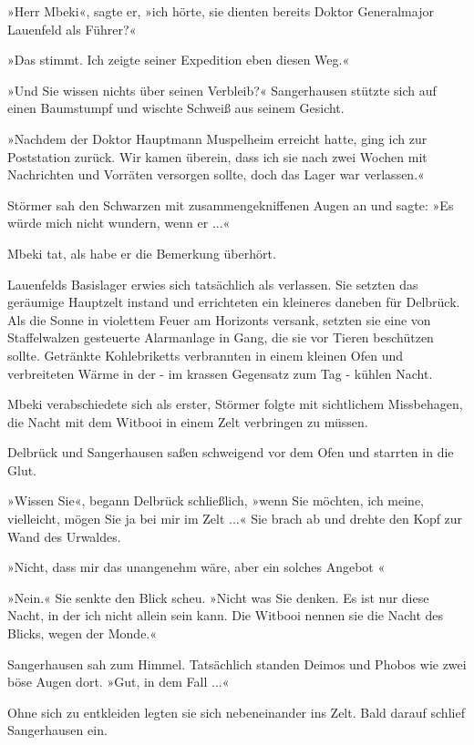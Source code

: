 »Herr Mbeki«, sagte er, »ich hörte, sie dienten bereits Doktor
Generalmajor Lauenfeld als Führer?«

»Das stimmt. Ich zeigte seiner Expedition eben diesen Weg.«

»Und Sie wissen nichts über seinen Verbleib?« Sangerhausen stützte
sich auf einen Baumstumpf und wischte Schweiß aus seinem Gesicht.

»Nachdem der Doktor Hauptmann Muspelheim erreicht hatte, ging ich
zur Poststation zurück. Wir kamen überein, dass ich sie nach zwei
Wochen mit Nachrichten und Vorräten versorgen sollte, doch das
Lager war verlassen.«

Störmer sah den Schwarzen mit zusammengekniffenen Augen an und
sagte: »Es würde mich nicht wundern, wenn er ...«

Mbeki tat, als habe er die Bemerkung überhört.

\bigpar

Lauenfelds Basislager erwies sich tatsächlich als verlassen. Sie
setzten das geräumige Hauptzelt instand und errichteten ein
kleineres daneben für Delbrück. Als die Sonne in violettem Feuer am
Horizonts versank, setzten sie eine von Staffelwalzen gesteuerte
Alarmanlage in Gang, die sie vor Tieren beschützen sollte.
Getränkte Kohlebriketts verbrannten in einem kleinen Ofen und
verbreiteten Wärme in der - im krassen Gegensatz zum Tag - kühlen
Nacht.

Mbeki verabschiedete sich als erster, Störmer folgte mit
sichtlichem Missbehagen, die Nacht mit dem Witbooi in einem Zelt
verbringen zu müssen.

Delbrück und Sangerhausen saßen schweigend vor dem Ofen und
starrten in die Glut.

»Wissen Sie«, begann Delbrück schließlich, »wenn Sie möchten, ich
meine, vielleicht, mögen Sie ja bei mir im Zelt ...« Sie brach ab
und drehte den Kopf zur Wand des Urwaldes.

»Nicht, dass mir das unangenehm wäre, aber ein solches Angebot \dash{}«

»Nein.« Sie senkte den Blick scheu. »Nicht was Sie denken. Es ist
nur diese Nacht, in der ich nicht allein sein kann. Die Witbooi
nennen sie die Nacht des Blicks, wegen der Monde.«

Sangerhausen sah zum Himmel. Tatsächlich standen Deimos und Phobos
wie zwei böse Augen dort. »Gut, in dem Fall ...«

Ohne sich zu entkleiden legten sie sich nebeneinander ins Zelt.
Bald darauf schlief Sangerhausen ein.

